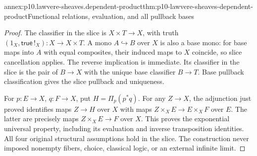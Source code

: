 \begin{annexitem}{annex:p10.lawvere-sheaves.dependent-product}{thm:p10-lawvere-sheaves-dependent-product}{Functional relations, evaluation, and all pullback bases}
\begin{proof}
The classifier in the slice is \(X\times T\to X\),
with truth \((1_X,\mathsf{true}\,!_X):X\to X\times T\).
A mono \(A\hookrightarrow B\) over \(X\) is also a
base mono: for base maps into \(A\) with equal composites,
their induced maps to \(X\) coincide, so slice cancellation
applies.  The reverse implication is immediate.  Its classifier
in the slice is the pair of \(B\to X\) with the unique
base classifier \(B\to T\).  Base pullback classification
gives the slice pullback and uniqueness.

For \(p:E\to X\), \(q:F\to X\), put
\(H=\Pi_p(p^*q)\).  For any \(Z\to X\), the adjunction
just proved identifies maps \(Z\to H\) over \(X\) with
maps \(Z\times_XE\to E\times_XF\) over \(E\).
The latter are precisely maps \(Z\times_XE\to F\) over
\(X\).  This proves the exponential universal property,
including its evaluation and inverse transposition identities.
All four original structural assumptions hold in the slice.
The construction never imposed nonempty fibers, choice, classical
logic, or an external infinite limit.
\end{proof}
\end{annexitem}

